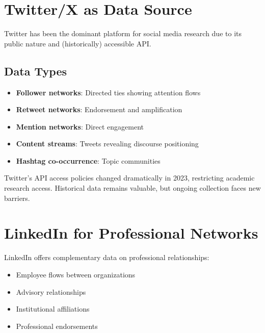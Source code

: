 \documentclass[../main.tex]{subfiles}
\begin{document}
\section*{Twitter/X as Data Source}

Twitter has been the dominant platform for social media research due to its public nature and (historically) accessible API.

\subsection*{Data Types}

\begin{itemize}[leftmargin=*, itemsep=0.2em]
\item \textbf{Follower networks}: Directed ties showing attention flows
\item \textbf{Retweet networks}: Endorsement and amplification
\item \textbf{Mention networks}: Direct engagement
\item \textbf{Content streams}: Tweets revealing discourse positioning
\item \textbf{Hashtag co-occurrence}: Topic communities
\end{itemize}

\begin{criticalbox}
Twitter's API access policies changed dramatically in 2023, restricting academic research access. Historical data remains valuable, but ongoing collection faces new barriers.
\end{criticalbox}


\section*{LinkedIn for Professional Networks}

LinkedIn offers complementary data on professional relationships:

\begin{itemize}[leftmargin=*, itemsep=0.2em]
\item Employee flows between organizations
\item Advisory relationships
\item Institutional affiliations
\item Professional endorsements
\end{itemize}
\end{document}
